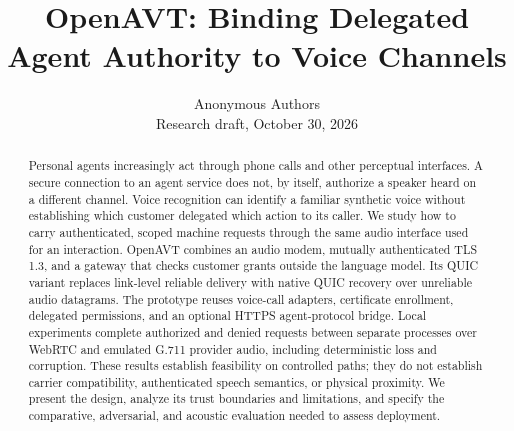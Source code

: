 \documentclass[letterpaper,twocolumn,10pt]{article}
\title{OpenAVT: Binding Delegated Agent Authority to Voice Channels}
\author{Anonymous Authors\\Research draft, October 30, 2026}
\date{}
\newcommand{\sys}{OpenAVT}
\begin{document}
\maketitle
\begin{abstract}
Personal agents increasingly act through phone calls and other perceptual interfaces.
A secure connection to an agent service does not, by itself, authorize a speaker
heard on a different channel. Voice recognition can identify a familiar synthetic
voice without establishing which customer delegated which action to its caller.
We study how to carry authenticated, scoped machine requests through the same
audio interface used for an interaction. \sys{} combines an audio modem, mutually
authenticated TLS 1.3, and a gateway that checks customer grants outside the language
model. Its QUIC variant replaces link-level reliable delivery with native QUIC
recovery over unreliable audio datagrams. The prototype reuses voice-call adapters,
certificate enrollment, delegated permissions, and an optional HTTPS agent-protocol
bridge. Local experiments complete authorized and denied requests between separate
processes over WebRTC and emulated G.711 provider audio, including deterministic
loss and corruption. These results establish feasibility on controlled paths;
they do not establish carrier compatibility, authenticated speech semantics, or
physical proximity. We present the design, analyze its trust boundaries and
limitations, and specify the comparative, adversarial, and acoustic evaluation
needed to assess deployment.
\end{abstract}










\appendix

\end{document}
